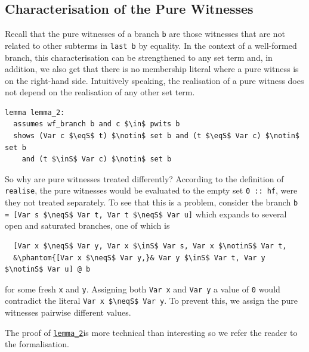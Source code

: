 \documentclass[runningheads]{llncs}
\newcommand{\inS}{\in_\text{s}}
\newcommand{\notinS}{\notin_\text{s}}
\newcommand{\eqS}{=_\text{s}}
\newcommand{\neqS}{\neq_\text{s}}
\begin{document}
\subsection{Characterisation of the Pure Witnesses\label{sec:pwits}}
Recall that the pure witnesses of a branch \lstinline!b! are those witnesses that are not related to other subterms in \lstinline!last b! by equality.
In the context of a well-formed branch, this characterisation can be strengthened to any set term and, in addition, we also get that there is no membership literal where a pure witness is on the right-hand side.
Intuitively speaking, the realisation of a pure witness does not depend on the realisation of any other set term.
\begin{lstlisting}[label={lst:lemma_2}]
lemma lemma_2:
  assumes wf_branch b and c $\in$ pwits b
  shows (Var c $\eqS$ t) $\notin$ set b and (t $\eqS$ Var c) $\notin$ set b
    and (t $\inS$ Var c) $\notin$ set b
\end{lstlisting}
\newcommand{\reflemmatwo}{\hyperref[lst:lemma_2]{\lstinline!lemma_2!}}
So why are pure witnesses treated differently?
According to the definition of \lstinline!realise!, the pure witnesses would be evaluated to the empty set \lstinline!0 :: hf!, were they not treated separately. 
To see that this is a problem, consider the branch
\lstinline!b = [Var s $\neqS$ Var t, Var t $\neqS$ Var u]!
which expands to several open and saturated branches, one of which is
\begin{lstlisting}
  [Var x $\neqS$ Var y, Var x $\inS$ Var s, Var x $\notinS$ Var t,
  &\phantom{[Var x $\neqS$ Var y,}& Var y $\inS$ Var t, Var y $\notinS$ Var u] @ b
\end{lstlisting}
for some fresh \lstinline!x! and \lstinline!y!.
Assigning both \lstinline!Var x! and \lstinline!Var y! a value of \lstinline!0! would contradict the literal \lstinline!Var x $\neqS$ Var y!.
To prevent this, we assign the pure witnesses pairwise different values.

The proof of \reflemmatwo is more technical than interesting so we refer the reader to the formalisation.
\end{document}
